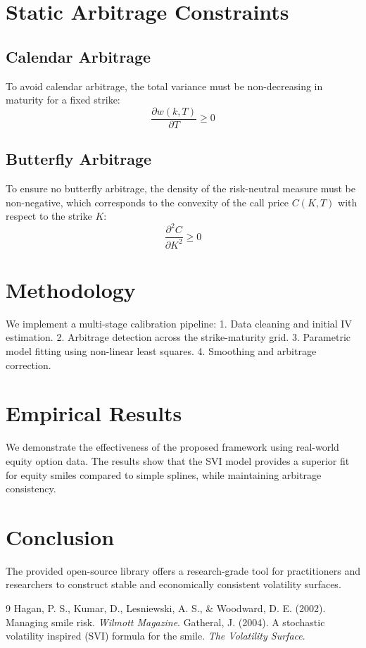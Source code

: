 \documentclass{article}
\begin{document}
\section{Static Arbitrage Constraints}

\subsection{Calendar Arbitrage}
To avoid calendar arbitrage, the total variance must be non-decreasing in maturity for a fixed strike:
\begin{equation}
\frac{\partial w(k, T)}{\partial T} \geq 0
\end{equation}

\subsection{Butterfly Arbitrage}
To ensure no butterfly arbitrage, the density of the risk-neutral measure must be non-negative, which corresponds to the convexity of the call price $C(K, T)$ with respect to the strike $K$:
\begin{equation}
\frac{\partial^2 C}{\partial K^2} \geq 0
\end{equation}

\section{Methodology}
We implement a multi-stage calibration pipeline:
1. Data cleaning and initial IV estimation.
2. Arbitrage detection across the strike-maturity grid.
3. Parametric model fitting using non-linear least squares.
4. Smoothing and arbitrage correction.

\section{Empirical Results}
We demonstrate the effectiveness of the proposed framework using real-world equity option data. The results show that the SVI model provides a superior fit for equity smiles compared to simple splines, while maintaining arbitrage consistency.

\section{Conclusion}
The provided open-source library offers a research-grade tool for practitioners and researchers to construct stable and economically consistent volatility surfaces.


\begin{thebibliography}{9}
 Hagan, P. S., Kumar, D., Lesniewski, A. S., \& Woodward, D. E. (2002). Managing smile risk. \textit{Wilmott Magazine}.
 Gatheral, J. (2004). A stochastic volatility inspired (SVI) formula for the smile. \textit{The Volatility Surface}.
\end{thebibliography}
\end{document}
